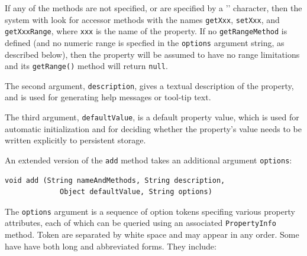 If any of the methods are not specified, or are specified by a '{\tt *}'
character, then the system with look for accessor methods with the
names {\tt getXxx}, {\tt setXxx}, and {\tt getXxxRange},
where {\tt xxx} is the name
of the property. If no {\tt getRangeMethod} is defined (and no numeric
range is specfied in the {\tt options} argument string, as described
below), then the property will be assumed to have no range limitations
and its {\tt getRange()} method will return {\tt null}.

The second argument, {\tt description}, gives a textual description of
the property, and is used for generating help messages or tool-tip
text.

The third argument, {\tt defaultValue}, is a default property value,
which is used for automatic initialization and for deciding whether
the property's value needs to be written explicitly to persistent
storage.

An extended version of the {\tt add} method takes an additional
argument {\tt options}:
\begin{lstlisting}[]
   void add (String nameAndMethods, String description, 
             Object defaultValue, String options)
\end{lstlisting}
The {\tt options} argument is a sequence of option tokens specifing
various property attributes, each of which can be queried using an
associated {\tt PropertyInfo} method.  Token are separated by white
space and may appear in any order. Some have have both long and
abbreviated forms.  They include:

